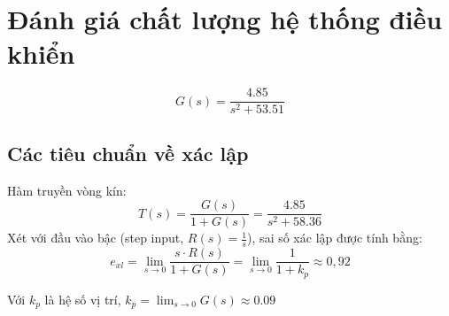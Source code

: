 \chapter{Đánh giá chất lượng hệ thống điều khiển}
\[
    G(s) = \frac{4.85}{s^2 + 53.51}
\]
\section{Các tiêu chuẩn về xác lập}
Hàm truyền vòng kín:
\[
    T(s) = \frac{G(s)}{1+G(s)} = \frac{4.85}{s^2 + 58.36}
\]
Xét với đầu vào bậc (step input, $R(s)=\frac{1}{s}$), sai số xác lập được tính bằng:
\[
e_{xl} = \lim_{s \to 0} \frac{s \cdot R(s)}{1 + G(s)} 
= \lim_{s \to 0} \frac{1}{1 + k_p} \approx 0{,}92
\]
\begin{center}
    Với $k_p$  là hệ số vị trí, $k_p = \lim_{s \to 0} G(s) \approx 0.09$ 
\end{center}